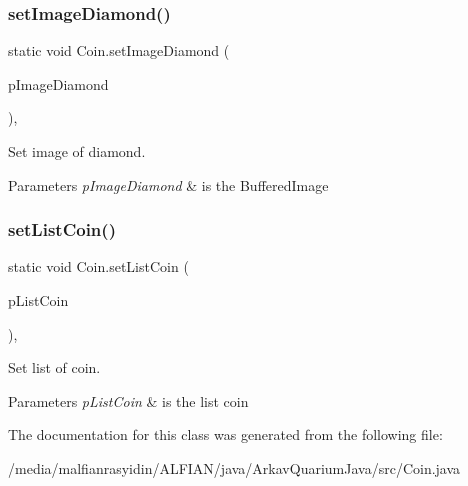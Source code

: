 \subsubsection{\texorpdfstring{set\+Image\+Diamond()}{setImageDiamond()}}
{\footnotesize\ttfamily static void Coin.\+set\+Image\+Diamond (\begin{DoxyParamCaption}\item[{final Buffered\+Image}]{p\+Image\+Diamond }\end{DoxyParamCaption})\hspace{0.3cm}{\ttfamily [inline]}, {\ttfamily [static]}}

Set image of diamond.


\begin{DoxyParams}{Parameters}
{\em p\+Image\+Diamond} & is the Buffered\+Image \\
\hline
\end{DoxyParams}
\mbox{\label{class_coin_afd75c4b3e2880aaed0bf3ced9ebc2704}} 
\subsubsection{\texorpdfstring{set\+List\+Coin()}{setListCoin()}}
{\footnotesize\ttfamily static void Coin.\+set\+List\+Coin (\begin{DoxyParamCaption}\item[{final \mbox{\hyperlink{class_linked_list}{Linked\+List}}$<$ \mbox{\hyperlink{class_coin}{Coin}} $>$}]{p\+List\+Coin }\end{DoxyParamCaption})\hspace{0.3cm}{\ttfamily [inline]}, {\ttfamily [static]}}

Set list of coin.


\begin{DoxyParams}{Parameters}
{\em p\+List\+Coin} & is the list coin \\
\hline
\end{DoxyParams}


The documentation for this class was generated from the following file\+:\begin{DoxyCompactItemize}
\item 
/media/malfianrasyidin/\+A\+L\+F\+I\+A\+N/java/\+Arkav\+Quarium\+Java/src/Coin.\+java\end{DoxyCompactItemize}
